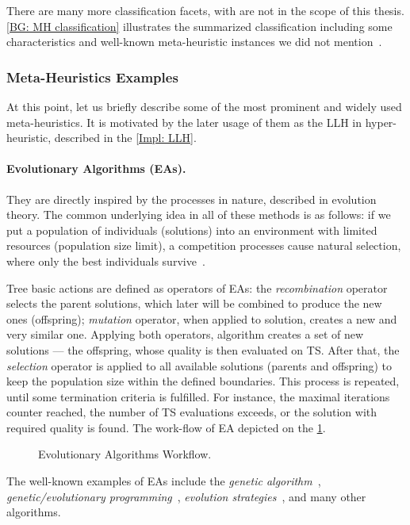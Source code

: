There are many more classification facets, with are not in the scope of this thesis. \cref{BG: MH classification} illustrates the summarized classification including some characteristics and well-known meta-heuristic instances we did not mention~\cite{wiki_MH_classification}.


\subsubsection{Meta-Heuristics Examples}\label{BG: MH Examples}
At this point, let us briefly describe some of the most prominent and widely used meta-heuristics. It is motivated by the later usage of them as the LLH in hyper-heuristic, described in the \cref{Impl: LLH}.

\paragraph{Evolutionary Algorithms (EAs).} 
They are directly inspired by the processes in nature, described in evolution theory. The common underlying idea in all of these methods is as follows: if we put a population of individuals (solutions) into an environment with limited resources (population size limit), a competition processes cause natural selection, where only the best individuals survive~\cite{eiben2015evolutionary}.

Tree basic actions are defined as operators of EAs: the \emph{recombination} operator selects the parent solutions, which later will be combined to produce the new ones (offspring); \emph{mutation} operator, when applied to solution, creates a new and very similar one. Applying both operators, algorithm creates a set of new solutions — the offspring, whose quality is then evaluated on TS. After that, the \textit{selection} operator is applied to all available solutions (parents and offspring) to keep the population size within the defined boundaries. This process is repeated, until some termination criteria is fulfilled. For instance, the maximal iterations counter reached, the number of TS evaluations exceeds, or the solution with required quality is found. The work-flow of EA depicted on the \cref{bg:pic:EAs}.

\begin{figure}
	\centering
	
	\caption{Evolutionary Algorithms Workflow.}
	\label{bg:pic:EAs}
\end{figure}

The well-known examples of EAs include the \textit{genetic algorithm}~\cite{sastry2005genetic}, \textit{genetic/evolutionary programming}~\cite{koza1992evolution}, \textit{evolution strategies}~\cite{beyer2002evolution}, and many other algorithms.

